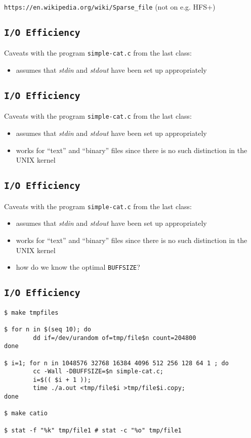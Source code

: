 \documentclass[xga]{xdvislides}
\begin{document}
\verb+https://en.wikipedia.org/wiki/Sparse_file+ (not on e.g. HFS+)


\subsection{{\tt I/O Efficiency}}
Caveats with the program {\tt simple-cat.c} from the last class:
\begin{itemize}
	\item assumes that {\em stdin} and {\em stdout} have been set up
		appropriately
\end{itemize}

\subsection{{\tt I/O Efficiency}}
Caveats with the program {\tt simple-cat.c} from the last class:
\begin{itemize}
	\item assumes that {\em stdin} and {\em stdout} have been set up
		appropriately
	\item works for ``text'' and ``binary'' files since there is no such
		distinction in the UNIX kernel
\end{itemize}

\subsection{{\tt I/O Efficiency}}
Caveats with the program {\tt simple-cat.c} from the last class:
\begin{itemize}
	\item assumes that {\em stdin} and {\em stdout} have been set up
		appropriately
	\item works for ``text'' and ``binary'' files since there is no such
		distinction in the UNIX kernel
	\item how do we know the optimal {\tt BUFFSIZE}?
\end{itemize}

\subsection{{\tt I/O Efficiency}}
\begin{verbatim}
$ make tmpfiles

$ for n in $(seq 10); do
        dd if=/dev/urandom of=tmp/file$n count=204800
done

$ i=1; for n in 1048576 32768 16384 4096 512 256 128 64 1 ; do
        cc -Wall -DBUFFSIZE=$n simple-cat.c;
        i=$(( $i + 1 ));
        time ./a.out <tmp/file$i >tmp/file$i.copy;
done

$ make catio

$ stat -f "%k" tmp/file1 # stat -c "%o" tmp/file1
\end{verbatim}
\end{document}
